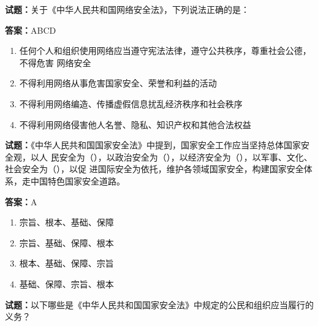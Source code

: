 \documentclass{ctexbook}
\begin{document}


\vspace{1em}

\textbf{试题：}关于《中华人民共和国网络安全法》，下列说法正确的是： 

\textbf{答案：}ABCD 

\begin{enumerate}[leftmargin=3em]
  \item 任何个人和组织使用网络应当遵守宪法法律，遵守公共秩序，尊重社会公德，不得危害
网络安全 

  \item 不得利用网络从事危害国家安全、荣誉和利益的活动 

  \item 不得利用网络编造、传播虚假信息扰乱经济秩序和社会秩序 

  \item 不得利用网络侵害他人名誉、隐私、知识产权和其他合法权益 

\end{enumerate}





\vspace{1em}

\textbf{试题：}《中华人民共和国国家安全法》中提到，国家安全工作应当坚持总体国家安全观，以人
民安全为（），以政治安全为（），以经济安全为（），以军事、文化、社会安全为（），以促
进国际安全为依托，维护各领域国家安全，构建国家安全体系，走中国特色国家安全道路。 

\textbf{答案：}A 

\begin{enumerate}[leftmargin=3em]
  \item 宗旨、根本、基础、保障 

  \item 宗旨、基础、保障、根本 

  \item 根本、基础、保障、宗旨 

  \item 基础、保障、宗旨、根本 

\end{enumerate}






\vspace{1em}

\textbf{试题：}以下哪些是《中华人民共和国国家安全法》中规定的公民和组织应当履行的义务？ 
\end{document}
